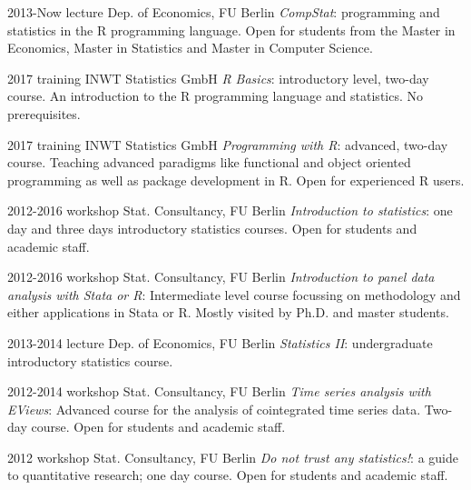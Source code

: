 \documentclass[]{friggeri-cv} %
\begin{document}
\begin{entrylist}


\entry
{2013-Now}
{lecture}
{Dep. of Economics, FU Berlin}
{\emph{CompStat}: programming and statistics in the R programming language. Open for students from the Master in Economics, Master in Statistics and Master in Computer Science.}


\entry
{2017}
{training}
{INWT Statistics GmbH}
{\emph{R Basics}: introductory level, two-day course. An introduction to the R programming language and statistics. No prerequisites.}


\entry
{2017}
{training}
{INWT Statistics GmbH}
{\emph{Programming with R}: advanced, two-day course. Teaching advanced paradigms like functional and object oriented programming as well as package development in R. Open for experienced R users.}

\end{entrylist}
\begin{entrylist}


\entry
{2012-2016}
{workshop}
{Stat. Consultancy, FU Berlin}
{\emph{Introduction to statistics}: one day and three days introductory statistics courses. Open for students and academic staff.}


\entry
{2012-2016}
{workshop}
{Stat. Consultancy, FU Berlin}
{\emph{Introduction to panel data analysis with Stata or R}: Intermediate level course focussing on methodology and either applications in Stata or R. Mostly visited by Ph.D. and master students.}


\entry
{2013-2014}
{lecture}
{Dep. of Economics, FU Berlin}
{\emph{Statistics II}: undergraduate introductory statistics course.}


\entry
{2012-2014}
{workshop}
{Stat. Consultancy, FU Berlin}
{\emph{Time series analysis with EViews}: Advanced course for the analysis of cointegrated time series data. Two-day course. Open for students and academic staff.}


\entry
{2012}
{workshop}
{Stat. Consultancy, FU Berlin}
{\emph{Do not trust any statistics!}: a guide to quantitative research; one day course. Open for students and academic staff.}

%
\end{entrylist}
\end{document}
